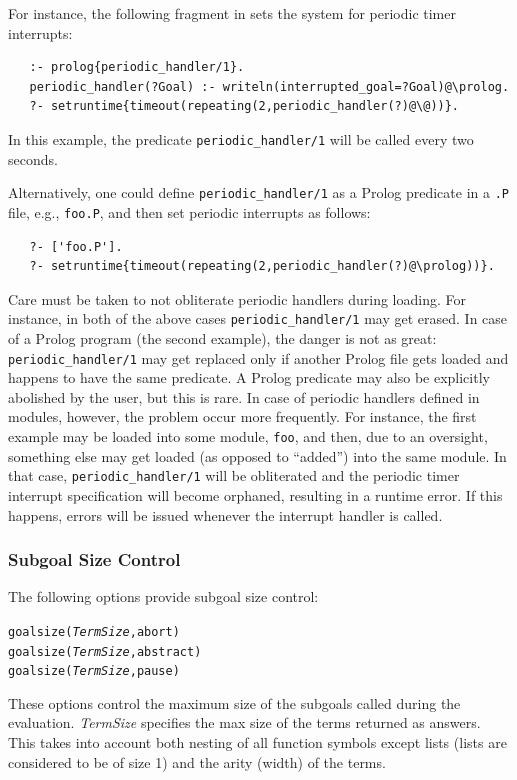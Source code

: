 \documentclass[11pt]{article}
\newcommand{\ERGO}{\mbox{\smaller{\ensuremath{\cal{E}}\smaller{{\sc{RGO}}}}}\xspace}
\newcommand{\FLSYSTEM}{\ERGO}
\begin{document}
For instance, the following fragment in \FLSYSTEM sets the system for periodic
timer interrupts:
\begin{verbatim}
   :- prolog{periodic_handler/1}.
   periodic_handler(?Goal) :- writeln(interrupted_goal=?Goal)@\prolog.
   ?- setruntime{timeout(repeating(2,periodic_handler(?)@\@))}.
\end{verbatim}
In this example, the \FLSYSTEM predicate \texttt{periodic\_handler/1} will be
called every two seconds. 

Alternatively, one could define \texttt{periodic\_handler/1} as a Prolog
predicate in a \texttt{.P} file,
e.g., \texttt{foo.P}, and then set
periodic interrupts as follows:  
\begin{verbatim}
   ?- ['foo.P'].
   ?- setruntime{timeout(repeating(2,periodic_handler(?)@\prolog))}.
\end{verbatim}

Care must be taken to not obliterate periodic handlers
during loading. For instance, in both of the above cases
\texttt{periodic\_handler/1} may get erased. In case of a Prolog program
(the second example), the danger is not as great:
\texttt{periodic\_handler/1} may get replaced only if another Prolog file gets
loaded and happens to have the same predicate. A Prolog predicate may also
be explicitly abolished by the user, but this is rare.
In case of periodic handlers defined in \FLSYSTEM
modules, however, the problem occur more frequently. For instance, the first example may
be loaded into some module, \texttt{foo}, and then, due to an oversight,
something else may get loaded (as opposed to ``added'') into the same module.
In that case, \texttt{periodic\_handler/1} will be obliterated and the
periodic timer interrupt specification
will become orphaned, resulting in a runtime error. If this happens, errors will
be issued whenever the interrupt handler is called.

\subsubsection{Subgoal Size Control}\label{sec-size-control}

The following options provide subgoal size control:
\begin{alltt}
    goalsize(\emph{TermSize},abort)
    goalsize(\emph{TermSize},abstract)
    goalsize(\emph{TermSize},pause)
\end{alltt}
These options control the maximum size of the subgoals called during the
evaluation. \emph{TermSize} specifies the max size of the terms returned as
answers. This takes into account both nesting of all function
symbols except lists (lists are considered to be of size 1) and the arity
(width) of the terms.
\end{document}
